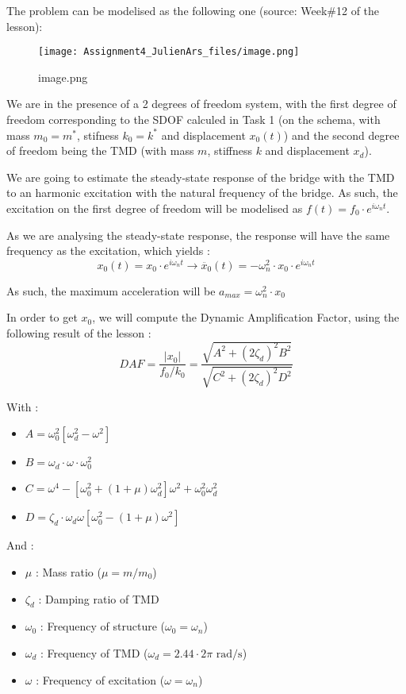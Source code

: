 \documentclass[11pt]{article}
\providecommand{\tightlist}{%
      \setlength{\itemsep}{0pt}\setlength{\parskip}{0pt}}
\begin{document}
    The problem can be modelised as the following one (source: Week\#12 of
the lesson):

\begin{figure}
\centering
\texttt{[image: Assignment4\_JulienArs\_files/image.png]}
\caption{image.png}
\end{figure}

We are in the presence of a 2 degrees of freedom system, with the first
degree of freedom corresponding to the SDOF calculed in Task 1 (on the
schema, with mass \(m_0 = m^*\), stifness \(k_0 = k^*\) and displacement
\(x_0 (t)\)) and the second degree of freedom being the TMD (with mass
\(m\), stiffness \(k\) and displacement \(x_d\)).

We are going to estimate the steady-state response of the bridge with
the TMD to an harmonic excitation with the natural frequency of the
bridge. As such, the excitation on the first degree of freedom will be
modelised as \(f(t) = f_0 \cdot e^{i\omega_n t}\).

    As we are analysing the steady-state response, the response will have
the same frequency as the excitation, which yields :
\[ x_0(t) = x_0  \cdot e^{i\omega_n t} \rightarrow \ddot{x_0}(t) = - \omega_n^2 \cdot x_0 \cdot e^{i\omega_n t} \]

As such, the maximum acceleration will be
\(a_{max} = \omega_n^2 \cdot x_0\)

    In order to get \(x_0\), we will compute the Dynamic Amplification
Factor, using the following result of the lesson : \[
DAF = \frac{\left|x_0\right|}{f_0 / k_0}=\frac{\sqrt{A^2+\left(2 \zeta_d\right)^2 B^2}}{\sqrt{C^2+\left(2 \zeta_d\right)^2 D^2}}
\]

    With :

\begin{itemize}
\tightlist
\item
  \(A = \omega_0^2\left[\omega_d^2-\omega^2\right]\)
\item
  \(B = \omega_d \cdot \omega \cdot \omega_0^2\)
\item
  \(C = \omega^4-\left[\omega_0^2+(1+\mu) \omega_d^2\right] \omega^2+\omega_0^2 \omega_d^2\)
\item
  \(D = \zeta_d \cdot \omega_d \omega\left[\omega_0^2-(1+\mu) \omega^2\right]\)
\end{itemize}

    And :

\begin{itemize}
\tightlist
\item
  \(\mu\) : Mass ratio (\(\mu=m / m_0\))
\item
  \(\zeta_d\) : Damping ratio of TMD
\item
  \(\omega_0\) : Frequency of structure (\(\omega_0 = \omega_n\))
\item
  \(\omega_d\) : Frequency of TMD
  (\(\omega_d = 2.44 \cdot 2\pi \text{ rad/s}\))
\item
  \(\omega\) : Frequency of excitation (\(\omega = \omega_n\))
\end{itemize}
\end{document}
